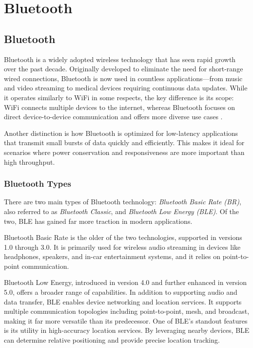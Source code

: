 \chapter{Bluetooth}\label{text}
\section{Bluetooth}

Bluetooth is a widely adopted wireless technology that has seen rapid growth over the past decade. Originally developed to eliminate the need for short-range wired connections, Bluetooth is now used in countless applications—from music and video streaming to medical devices requiring continuous data updates. 
While it operates similarly to WiFi in some respects, the key difference is its scope: WiFi connects multiple devices to the internet, whereas Bluetooth focuses on direct device-to-device communication and offers more diverse use cases \cite{intelBLEguide}.

Another distinction is how Bluetooth is optimized for low-latency applications that transmit small bursts of data quickly and efficiently.
 This makes it ideal for scenarios where power conservation and responsiveness are more important than high throughput.

\subsection{Bluetooth Types}

There are two main types of Bluetooth technology: \textit{Bluetooth Basic Rate (BR)}, also referred to as \textit{Bluetooth Classic}, and \textit{Bluetooth Low Energy (BLE)}. Of the two, BLE has gained far more traction in modern applications.

Bluetooth Basic Rate is the older of the two technologies, supported in versions 1.0 through 3.0. It is primarily used for wireless audio streaming in devices like headphones, speakers, and in-car entertainment systems, and it relies on point-to-point communication.

Bluetooth Low Energy, introduced in version 4.0 and further enhanced in version 5.0, offers a broader range of capabilities. In addition to supporting audio and data transfer, BLE enables device networking and location services. It supports multiple communication topologies including point-to-point, mesh, and broadcast, making it far more versatile than its predecessor. One of BLE’s standout features is its utility in high-accuracy location services. By leveraging nearby devices, BLE can determine relative positioning and provide precise location tracking.

